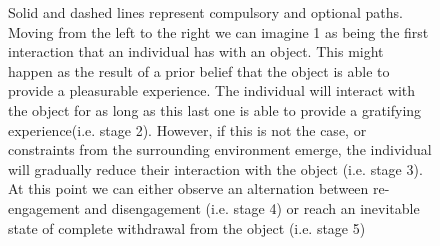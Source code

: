 \begin{figure}[h]
\caption[\textbf{Stages of the engagement process mode}]{Solid and dashed lines represent compulsory and  optional paths. Moving from the left to the right we can imagine 1 as being the first interaction that an individual has with an object. This might happen as the result of a prior belief that the object is able to provide a pleasurable experience. The individual will interact with the object for as long as this last one is able to provide a gratifying experience(i.e. stage 2). However, if this is not the case, or constraints from the surrounding environment emerge, the individual will gradually reduce their interaction with the object (i.e. stage 3). At this point we can either observe an alternation between re-engagement and disengagement (i.e. stage 4) or reach an inevitable state of complete withdrawal from the object (i.e. stage 5)}
\label{fig: eng_proc_model_1}
\end{figure}